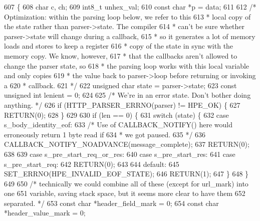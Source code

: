 \begin{DoxyCode}
607 \{
608   \textcolor{keywordtype}{char} c, ch;
609   int8\_t unhex\_val;
610   \textcolor{keyword}{const} \textcolor{keywordtype}{char} *p = data;
611 
612   \textcolor{comment}{/* Optimization: within the parsing loop below, we refer to this}
613 \textcolor{comment}{   * local copy of the state rather than parser->state.  The compiler}
614 \textcolor{comment}{   * can't be sure whether parser->state will change during a callback,}
615 \textcolor{comment}{   * so it generates a lot of memory loads and stores to keep a register}
616 \textcolor{comment}{   * copy of the state in sync with the memory copy.  We know, however,}
617 \textcolor{comment}{   * that the callbacks aren't allowed to change the parser state, so}
618 \textcolor{comment}{   * the parsing loop works with this local variable and only copies}
619 \textcolor{comment}{   * the value back to parser->loop before returning or invoking a}
620 \textcolor{comment}{   * callback.}
621 \textcolor{comment}{   */}
622   \textcolor{keywordtype}{unsigned} \textcolor{keywordtype}{char} state = parser->state;
623   \textcolor{keyword}{const} \textcolor{keywordtype}{unsigned} \textcolor{keywordtype}{int} lenient = 0;
624 
625   \textcolor{comment}{/* We're in an error state. Don't bother doing anything. */}
626   \textcolor{keywordflow}{if} (HTTP_PARSER_ERRNO(parser) != HPE_OK) \{
627     RETURN(0);
628   \}
629 
630   \textcolor{keywordflow}{if} (len == 0) \{
631     \textcolor{keywordflow}{switch} (state) \{
632       \textcolor{keywordflow}{case} s_body_identity_eof:
633         \textcolor{comment}{/* Use of CALLBACK\_NOTIFY() here would erroneously return 1 byte read if}
634 \textcolor{comment}{         * we got paused.}
635 \textcolor{comment}{         */}
636         CALLBACK_NOTIFY_NOADVANCE(message\_complete);
637         RETURN(0);
638 
639       \textcolor{keywordflow}{case} s_pre_start_req_or_res:
640       \textcolor{keywordflow}{case} s_pre_start_res:
641       \textcolor{keywordflow}{case} s_pre_start_req:
642         RETURN(0);
643 
644       \textcolor{keywordflow}{default}:
645         SET_ERRNO(HPE_INVALID_EOF_STATE);
646         RETURN(1);
647     \}
648   \}
649 
650   \textcolor{comment}{/* technically we could combine all of these (except for url\_mark) into one}
651 \textcolor{comment}{     variable, saving stack space, but it seems more clear to have them}
652 \textcolor{comment}{     separated. */}
653   \textcolor{keyword}{const} \textcolor{keywordtype}{char} *header\_field\_mark = 0;
654   \textcolor{keyword}{const} \textcolor{keywordtype}{char} *header\_value\_mark = 0;

\end{DoxyCode}
